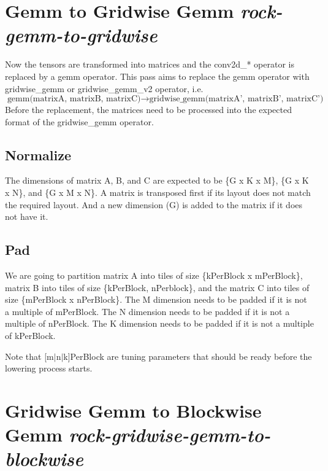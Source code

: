 \section{Gemm to Gridwise Gemm \emph{rock-gemm-to-gridwise}}
Now the tensors are transformed into matrices and the conv2d\_* operator is
replaced by a gemm operator.
This pass aims to replace the gemm operator with gridwise\_gemm or gridwise\_gemm\_v2
operator, i.e.
\begin{equation}
\text{gemm(matrixA, matrixB, matrixC)} \rightarrow \text{gridwise\_gemm(matrixA', matrixB', matrixC')}
\end{equation}
Before the replacement, the matrices need to be processed into the expected format
of the gridwise\_gemm operator.
\subsection{Normalize}
The dimensions of matrix A, B, and C are expected to be \{G x K x M\}, \{G x K x N\},
and \{G x M x N\}.
A matrix is transposed first if its layout does not match the required layout.
And a new dimension (G) is added to the matrix if it does not have it.

\subsection{Pad}
We are going to partition matrix A into tiles of size \{kPerBlock x mPerBlock\},
matrix B into tiles of size  \{kPerBlock, nPerblock\}, and
the matrix C into tiles of size \{mPerBlock x nPerBlock\}.
The M dimension needs to be padded if it is not a multiple of mPerBlock.
The N dimension needs to be padded if it is not a multiple of nPerBlock.
The K dimension needs to be padded if it is not a multiple of kPerBlock.

Note that [m$|$n$|$k]PerBlock are tuning parameters that should be ready
before the lowering process starts.

\section{Gridwise Gemm to Blockwise Gemm \emph{rock-gridwise-gemm-to-blockwise}}


